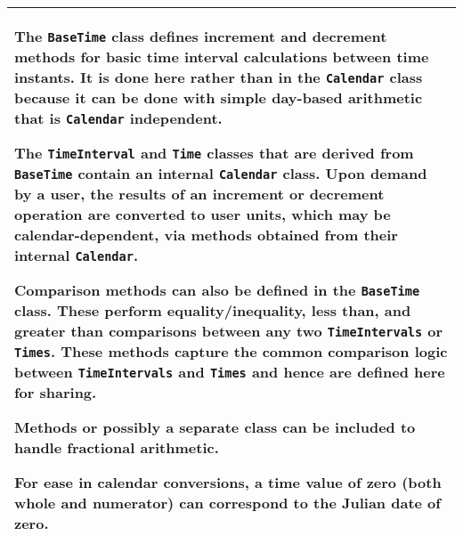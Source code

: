 \begin{tabular}{|p{6in}|}
The {\tt BaseTime} class defines increment and decrement methods for basic
time interval calculations between time instants.  It is done here rather
than in the {\tt Calendar} class because it can be done with simple 
day-based arithmetic that is {\tt Calendar} independent.  

The {\tt TimeInterval} and {\tt Time} classes that are derived from 
{\tt BaseTime} contain an internal {\tt Calendar} class.  Upon demand by 
a user, the results of an increment or decrement operation are 
converted to user units, which may be calendar-dependent, via methods 
obtained from their internal {\tt Calendar}.

Comparison methods can also be defined in the {\tt BaseTime} class.  These
perform equality/inequality, less than, and greater than comparisons
between any two {\tt TimeIntervals} or {\tt Times}.  These methods capture
the common comparison logic between {\tt TimeIntervals} and {\tt Times} and
hence are defined here for sharing.

Methods or possibly a separate class can be included to handle fractional
arithmetic. 

For ease in calendar conversions, a time value of zero (both whole and
numerator) can correspond to the Julian date of zero. \\
\hline
\end{tabular}












